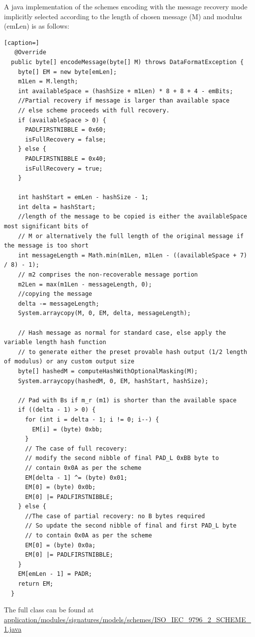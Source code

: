 \documentclass[]{final_report}
\theoremstyle{definition}
\begin{document}
A java implementation of the schemes encoding with the message recovery mode implicitly selected according to the length of chosen message (M) and modulus (emLen) is as follows: 
\begin{lstlisting}[caption=]
   @Override
  public byte[] encodeMessage(byte[] M) throws DataFormatException {
    byte[] EM = new byte[emLen];
    m1Len = M.length;
    int availableSpace = (hashSize + m1Len) * 8 + 8 + 4 - emBits;
    //Partial recovery if message is larger than available space
    // else scheme proceeds with full recovery.
    if (availableSpace > 0) {
      PADLFIRSTNIBBLE = 0x60;
      isFullRecovery = false;
    } else {
      PADLFIRSTNIBBLE = 0x40;
      isFullRecovery = true;
    }

    int hashStart = emLen - hashSize - 1;
    int delta = hashStart;
    //length of the message to be copied is either the availableSpace most significant bits of
    // M or alternatively the full length of the original message if the message is too short
    int messageLength = Math.min(m1Len, m1Len - ((availableSpace + 7) / 8) - 1);
    // m2 comprises the non-recoverable message portion
    m2Len = max(m1Len - messageLength, 0);
    //copying the message
    delta -= messageLength;
    System.arraycopy(M, 0, EM, delta, messageLength);

    // Hash message as normal for standard case, else apply the variable length hash function 
    // to generate either the preset provable hash output (1/2 length of modulus) or any custom output size
    byte[] hashedM = computeHashWithOptionalMasking(M);
    System.arraycopy(hashedM, 0, EM, hashStart, hashSize);

    // Pad with Bs if m_r (m1) is shorter than the available space
    if ((delta - 1) > 0) {
      for (int i = delta - 1; i != 0; i--) {
        EM[i] = (byte) 0xbb;
      }
      // The case of full recovery:
      // modify the second nibble of final PAD_L 0xBB byte to
      // contain 0x0A as per the scheme
      EM[delta - 1] ^= (byte) 0x01;
      EM[0] = (byte) 0x0b;
      EM[0] |= PADLFIRSTNIBBLE;
    } else {
      //The case of partial recovery: no B bytes required
      // So update the second nibble of final and first PAD_L byte
      // to contain 0x0A as per the scheme
      EM[0] = (byte) 0x0a;
      EM[0] |= PADLFIRSTNIBBLE;
    }
    EM[emLen - 1] = PADR;
    return EM;
  }
\end{lstlisting}

The full class can be found at \url{application/modules/signatures/models/schemes/ISO\_IEC\_9796\_2\_SCHEME\_1.java}
\end{document}
